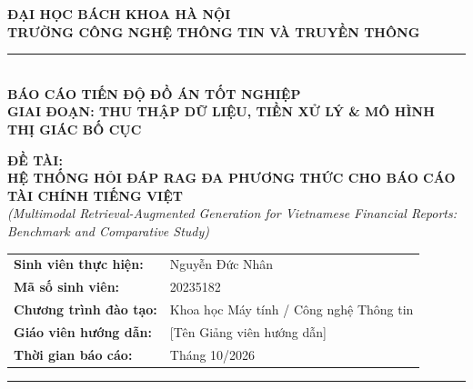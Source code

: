 \documentclass[a4paper,12pt]{article}
\begin{document}
\begin{center}
    {\large \textbf{ĐẠI HỌC BÁCH KHOA HÀ NỘI}}\\[0.2cm]
    {\large \textbf{TRƯỜNG CÔNG NGHỆ THÔNG TIN VÀ TRUYỀN THÔNG}}\\[0.8cm]
    \rule{0.5\textwidth}{1pt}\\[0.8cm]
    
    {\Large \textbf{BÁO CÁO TIẾN ĐỘ ĐỒ ÁN TỐT NGHIỆP}}\\[0.4cm]
    {\large \textbf{GIAI ĐOẠN: THU THẬP DỮ LIỆU, TIỀN XỬ LÝ \& MÔ HÌNH THỊ GIÁC BỐ CỤC}}\\[0.8cm]

    \begin{tcolorbox}[colback=gray!5!white, colframe=gray!60!black, width=\textwidth, arc=2mm]
        \centering
        \textbf{ĐỀ TÀI:}\\
        {\large \textbf{HỆ THỐNG HỎI ĐÁP RAG ĐA PHƯƠNG THỨC CHO BÁO CÁO TÀI CHÍNH TIẾNG VIỆT}}\\
        \textit{(Multimodal Retrieval-Augmented Generation for Vietnamese Financial Reports: Benchmark and Comparative Study)}
    \end{tcolorbox}
\end{center}

\vspace{0.4cm}
\begin{flushleft}
    \begin{tabular}{ll}
        \textbf{Sinh viên thực hiện:} & Nguyễn Đức Nhân \\
        \textbf{Mã số sinh viên:}     & 20235182 \\
        \textbf{Chương trình đào tạo:}& Khoa học Máy tính / Công nghệ Thông tin \\
        \textbf{Giáo viên hướng dẫn:} & [Tên Giảng viên hướng dẫn] \\
        \textbf{Thời gian báo cáo:}   & Tháng 10/2026 \\
    \end{tabular}
\end{flushleft}

\vspace{0.3cm}
\hrule
\vspace{0.5cm}

\end{document}
